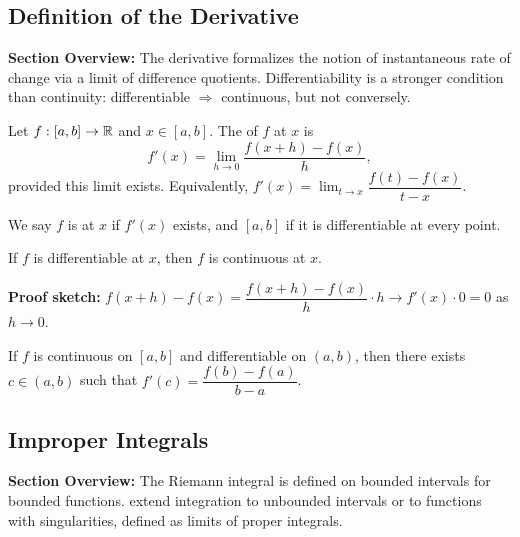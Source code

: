 \documentclass[../master/master.tex]{subfiles}
\begin{document}
\subsection{Definition of the Derivative}

\begin{summarybox}
\textbf{Section Overview:} The derivative formalizes the notion of instantaneous rate of change via a limit of difference quotients. Differentiability is a stronger condition than continuity: differentiable $\Rightarrow$ continuous, but not conversely.
\end{summarybox}

\begin{definition}
Let $f: [a,b] \to \mathbb{R}$ and $x \in [a,b]$. The  of $f$ at $x$ is
\[
    f'(x) = \lim_{h \to 0} \frac{f(x+h) - f(x)}{h},
\]
provided this limit exists. Equivalently, $f'(x) = \lim_{t \to x} \dfrac{f(t) - f(x)}{t - x}$.

We say $f$ is  at $x$ if $f'(x)$ exists, and  $[a,b]$ if it is differentiable at every point.
\end{definition}

\begin{theorem}
If $f$ is differentiable at $x$, then $f$ is continuous at $x$.
\end{theorem}

\begin{notebox}
\textbf{Proof sketch:} $f(x+h) - f(x) = \dfrac{f(x+h)-f(x)}{h} \cdot h \to f'(x) \cdot 0 = 0$ as $h \to 0$.
\end{notebox}

\begin{theorem}
If $f$ is continuous on $[a,b]$ and differentiable on $(a,b)$, then there exists $c \in (a,b)$ such that $f'(c) = \dfrac{f(b)-f(a)}{b-a}$.
\end{theorem}

\subsection{Improper Integrals}

\begin{summarybox}
\textbf{Section Overview:} The Riemann integral is defined on bounded intervals for bounded functions.  extend integration to unbounded intervals or to functions with singularities, defined as limits of proper integrals.
\end{summarybox}
\end{document}
